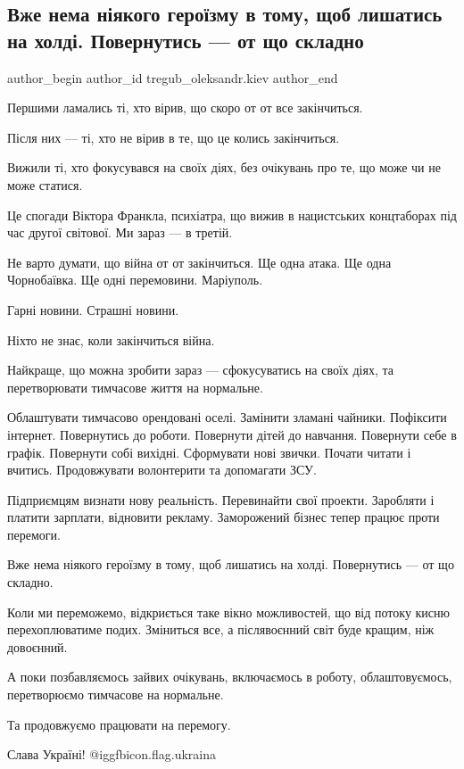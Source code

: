  
 
 
 
 
 
\subsection{Вже нема ніякого героїзму в тому, щоб лишатись на холді. Повернутись — от що складно}
\label{sec:29_03_2022.fb.tregub_oleksandr.kiev.1.geroizm_on_hold}
 
\ifcmt
 author_begin
   author_id tregub_oleksandr.kiev
 author_end
\fi

Першими ламались ті, хто вірив, що скоро от от все закінчиться. 

Після них — ті, хто не вірив в те, що це колись закінчиться.

Вижили ті, хто фокусувався на своїх діях, без очікувань про те, що може чи не
може статися.


Це спогади Віктора Франкла, психіатра, що вижив в нацистських концтаборах під
час другої світової. Ми зараз — в третій. 

Не варто думати, що війна от от закінчиться. Ще одна атака. Ще одна
Чорнобаївка. Ще одні перемовини. Маріуполь.

Гарні новини. Страшні новини.

Ніхто не знає, коли закінчиться війна.

Найкраще, що можна зробити зараз — сфокусуватись на своїх діях, та
перетворювати тимчасове життя на нормальне.

Облаштувати тимчасово орендовані оселі. Замінити зламані чайники. Пофіксити
інтернет. Повернутись до роботи. Повернути дітей до навчання. Повернути себе в
графік. Повернути собі вихідні. Сформувати нові звички. Почати читати і
вчитись. Продовжувати волонтерити та допомагати ЗСУ.

Підприємцям визнати нову реальність. Перевинайти свої проекти. Заробляти і
платити зарплати, відновити рекламу. Заморожений бізнес тепер працює проти
перемоги. 

Вже нема ніякого героїзму в тому, щоб лишатись на холді. Повернутись — от що
складно.

Коли ми переможемо, відкриється таке вікно можливостей, що від потоку кисню
перехоплюватиме подих. Зміниться все, а післявоєнний світ буде кращим, ніж
довоєнний. 

А поки позбавляємось зайвих очікувань, включаємось в роботу, облаштовуємось,
перетворюємо тимчасове на нормальне.

Та продовжуємо працювати на перемогу.

Слава Україні! @igg{fbicon.flag.ukraina}
